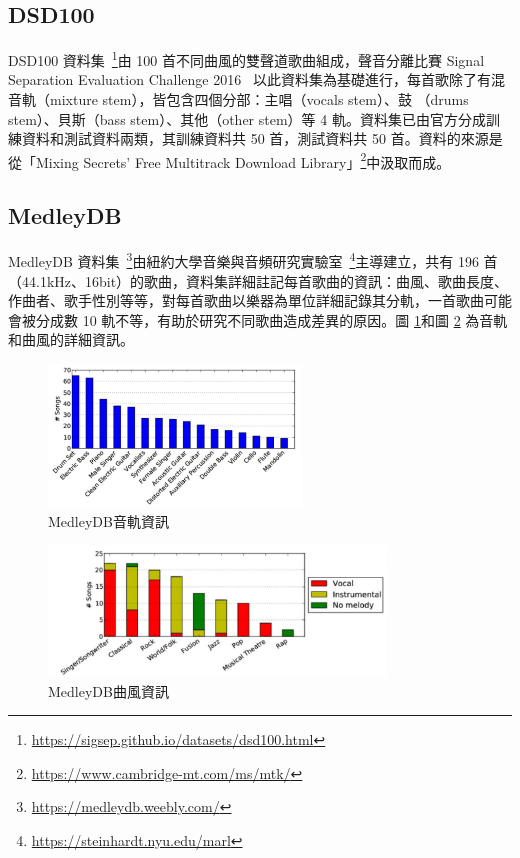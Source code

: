 \subsection{DSD100}
DSD100 資料集~\cite{SiSEC16}\footnote{\url{https://sigsep.github.io/datasets/dsd100.html}}由 100 首不同曲風的雙聲道歌曲組成，聲音分離比賽 Signal Separation Evaluation Challenge 2016~\cite{liutkus20172016} 以此資料集為基礎進行，每首歌除了有混音軌（mixture stem），皆包含四個分部：主唱（vocals stem）、鼓 （drums stem）、貝斯（bass stem）、其他（other stem）等 4 軌。資料集已由官方分成訓練資料和測試資料兩類，其訓練資料共 50 首，測試資料共 50 首。資料的來源是從「Mixing Secrets' Free Multitrack Download Library」\footnote{\url{https://www.cambridge-mt.com/ms/mtk/}}中汲取而成。

\subsection{MedleyDB}
MedleyDB 資料集~\cite{bittner2014medleydb}\footnote{\url{https://medleydb.weebly.com/}}由紐約大學音樂與音頻研究實驗室~\footnote{\url{https://steinhardt.nyu.edu/marl}}主導建立，共有 196 首（44.1kHz、16bit）的歌曲，資料集詳細註記每首歌曲的資訊：曲風、歌曲長度、作曲者、歌手性別等等，對每首歌曲以樂器為單位詳細記錄其分軌，一首歌曲可能會被分成數 10 軌不等，有助於研究不同歌曲造成差異的原因。圖 \ref{medleyDB_inst}和圖 \ref{medleyDB_genre} 為音軌和曲風的詳細資訊。

\begin{figure}[htbp]
    \centering
    \includegraphics[width=0.6\textwidth]{./figures/chapter03_dataset/medleyDB_inst.jpg}
    \caption{MedleyDB音軌資訊}
    \label{medleyDB_inst}
\end{figure}
\begin{figure}[htbp]
    \centering
    \includegraphics[width=0.8\textwidth]{./figures/chapter03_dataset/medleyDB_genre.jpg}
    \caption{MedleyDB曲風資訊}
    \label{medleyDB_genre}
\end{figure}

